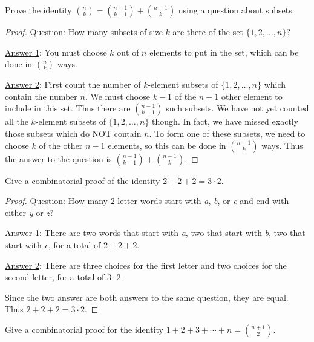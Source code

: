\begin{questions}

\question Prove the identity ${n\choose k} = {n-1 \choose k-1} + {n-1 \choose k}$ using a question about subsets.

	\begin{answer}
		\begin{proof}
			\underline{Question}: How many subsets of size $k$ are there of the set $\{1,2,\ldots, n\}$?
			
			\underline{Answer 1}: You must choose $k$ out of $n$ elements to put in the set, which can be done in ${n \choose k}$ ways.
			
			\underline{Answer 2}: First count the number of $k$-element subsets of $\{1,2,\ldots, n\}$ which contain the number $n$.  We must choose $k-1$ of the $n-1$ other element to include in this set.  Thus there are ${n-1\choose k-1}$ such subsets.  We have not yet counted all the $k$-element subsets of $\{1,2,\ldots, n\}$ though.  In fact, we have missed exactly those subsets which do NOT contain $n$.  To form one of these subsets, we need to choose $k$ of the other $n-1$ elements, so this can be done in ${n-1 \choose k}$ ways.    Thus the answer to the question is ${n-1 \choose k-1} + {n-1 \choose k}$.
		\end{proof}
	\end{answer}
	
	
\question Give a combinatorial proof of the identity $2+2+2 = 3\cdot 2$.

	\begin{answer}
		\begin{proof}
		\underline{Question}: How many 2-letter words start with \textit{a}, \textit{b}, or \textit{c} and end with either \textit{y} or \textit{z}?
		
		\underline{Answer 1}: There are two words that start with \textit{a}, two that start with \textit{b}, two that start with \textit{c}, for a total of $2+2+2$.
		
		\underline{Answer 2}:  There are three choices for the first letter and two choices for the second letter, for a total of $3 \cdot 2$.
		
		Since the two answer are both answers to the same question, they are equal.  Thus $2 + 2 + 2 = 3\cdot 2$.
		\end{proof}
	\end{answer}	

\question Give a combinatorial proof for the identity $1 + 2 + 3 + \cdots + n = {n+1 \choose 2}$. 
	

\end{questions}
